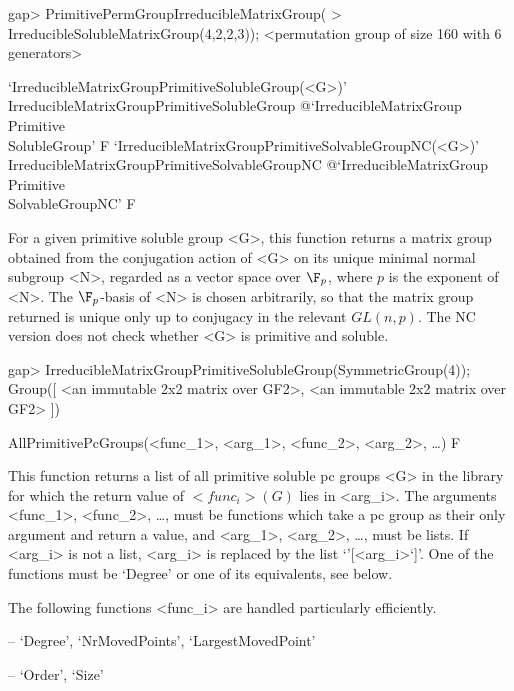 \beginexample
gap> PrimitivePermGroupIrreducibleMatrixGroup(
>       IrreducibleSolubleMatrixGroup(4,2,2,3));
<permutation group of size 160 with 6 generators>
\endexample

\>`IrreducibleMatrixGroupPrimitiveSolubleGroup(<G>)'%
{IrreducibleMatrixGroupPrimitiveSolubleGroup}%
@{`IrreducibleMatrixGroup\\Primitive\\SolubleGroup'} F
\>`IrreducibleMatrixGroupPrimitiveSolvableGroupNC(<G>)'%
{IrreducibleMatrixGroupPrimitiveSolvableGroupNC}%
@{`IrreducibleMatrixGroup\\Primitive\\SolvableGroupNC'} F

For a given primitive soluble group <G>, this function returns a matrix group 
obtained from the conjugation
action of <G> on its unique minimal normal subgroup <N>, regarded as a vector 
space over $\F_p$, where $p$ is the exponent of <N>. 
The $\F_p$-basis of <N> is chosen arbitrarily, so that the matrix group returned 
is unique only up to conjugacy in the relevant $GL(n, p)$. The NC version does
not check whether <G> is primitive and soluble.

\beginexample
gap> IrreducibleMatrixGroupPrimitiveSolubleGroup(SymmetricGroup(4));
Group([ <an immutable 2x2 matrix over GF2>, 
  <an immutable 2x2 matrix over GF2> ])
\endexample

\null


\>AllPrimitivePcGroups(<func_1>, <arg_1>, <func_2>, <arg_2>, \dots) F

This function returns a list of all primitive soluble pc
groups <G> in the  {\IRREDSOL} library for which the return value of $<func_i>(G)$ lies
in <arg_i>.  The arguments <func_1>, <func_2>, \dots,
must be {\GAP} functions which take a pc group as their only argument and return a
value, and <arg_1>, <arg_2>,
\dots,  must be lists. If <arg_i> is not a list, <arg_i> is replaced by the list
`'[<arg_i>`]'. One of the functions must be `Degree' or one of its
equivalents, see below.

The following functions <func_i> are handled particularly efficiently.

\beginlist
\item{--} `Degree', `NrMovedPoints', `LargestMovedPoint'
\item{--} `Order', `Size'
\endlist

